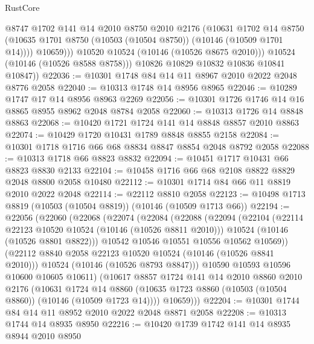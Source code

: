 \begin{lexlean}{RustCore}
\begin{coremodule}
                  @8747
                  @1702
                  @141
                  @14
                  @2010
                  @8750
                  @2010
                  @2176
                  (@10631
                    @1702
                    @14
                    @8750
                    (@10635 @1701 @8750 (@10503 (@10504 @8750)) (@10146 (@10509 @1701 @14))))
                  @10659)))
            @10520
            @10524
            (@10146 (@10526 @8675 @2010)))
          @10524
          (@10146 (@10526 @8588 @8758)))
        @10826
        @10829
        @10832
        @10836
        @10841
        @10847))
@22036 := @10301 @1748 @84 @14 @11 @8967 @2010 @2022 @2048 @8776 @2058
@22040 := @10313 @1748 @14 @8956 @8965
@22046 := @10289 @1747 @17 @14 @8956 @8963 @2269
@22056 := @10301 @1726 @1746 @14 @16 @8865 @8955 @8962 @2048 @8784 @2058
@22060 := @10313 @1726 @14 @8848 @8863
@22068 := @10420 @1721 @1724 @141 @14 @8848 @8857 @2010 @8863
@22074 := @10429 @1720 @10431 @1789 @8848 @8855 @2158
@22084 := @10301 @1718 @1716 @66 @68 @8834 @8847 @8854 @2048 @8792 @2058
@22088 := @10313 @1718 @66 @8823 @8832
@22094 := @10451 @1717 @10431 @66 @8823 @8830 @2133
@22104 := @10458 @1716 @66 @68 @2108 @8822 @8829 @2048 @8800 @2058 @10480
@22112 := @10301 @1714 @84 @66 @11 @8819 @2010 @2022 @2048
@22114 := @22112 @8810 @2058
@22123 := @10498 @1713 @8819 (@10503 (@10504 @8819)) (@10146 (@10509 @1713 @66))
@22194 := @22056
    (@22060
      (@22068
        (@22074
          (@22084
            (@22088
              (@22094
                (@22104
                  (@22114 @22123 @10520 @10524 (@10146 (@10526 @8811 @2010)))
                  @10524
                  (@10146 (@10526 @8801 @8822)))
                @10542
                @10546
                @10551
                @10556
                @10562
                @10569))
            (@22112 @8840 @2058 @22123 @10520 @10524 (@10146 (@10526 @8841 @2010)))
            @10524
            (@10146 (@10526 @8793 @8847)))
          @10590
          @10593
          @10596
          @10600
          @10605
          @10611)
        (@10617
          @8857
          @1724
          @141
          @14
          @2010
          @8860
          @2010
          @2176
          (@10631
            @1724
            @14
            @8860
            (@10635 @1723 @8860 (@10503 (@10504 @8860)) (@10146 (@10509 @1723 @14))))
          @10659)))
@22204 := @10301 @1744 @84 @14 @11 @8952 @2010 @2022 @2048 @8871 @2058
@22208 := @10313 @1744 @14 @8935 @8950
@22216 := @10420 @1739 @1742 @141 @14 @8935 @8944 @2010 @8950

\end{coremodule}
\end{lexlean}
